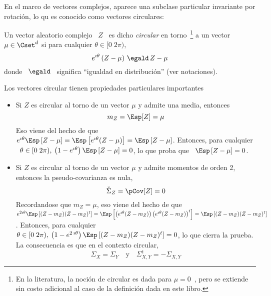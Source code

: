 En el  marco de vectores  complejos, aparece una subclase  particular invariante
por rotaci\'on, lo qu es conocido como vectores circulares:
%
\begin{definicion}\label{Def:MP:VectorAleatorioComplejoCircular}
%
  Un  vector   aleatorio  complejo   \  $Z$  \   es  dicho  {\em   circular}  en
  torno~\footnote{En la literatura, la noci\'on  de circular es dada para $\mu =
    0$~\cite[Def.~24.3.2]{Lap17}, pero  se extiende sin costo  adicional al caso
    de la  definici\'on dada en este libro.}   a un vector $\mu  \in \Cset^d$ si
  para cualquier $\theta \in [0 \; 2 \pi)$,
  \[
  e^{\imath \theta} \left( Z - \mu \right) \, \egald \, Z - \mu
  \]
  donde \ $\egald$ \ significa ``igualdad en distribuci\'on'' (ver notaciones).
\end{definicion}

Los vectores circular tienen propiedades particulares importantes
%
\begin{itemize}
\item  Si $Z$  es circular  al torno  de  un vector  $\mu$ y  admite una  media,
  entonces
  \[
  m_Z = \Esp[Z] = \mu
  \]
  Eso viene  del hecho de  que $e^{\imath \theta}  \Esp\left[ Z - \mu  \right] =
  \Esp\left[  e^{\imath  \theta}  (Z  -  \mu)  \right]  =  \Esp\left[  Z  -  \mu
  \right]$. Entonces,  para cualquier \ $\theta \in  [0 \; 2 \pi),  \: \left(1 -
    e^{\imath \theta} \right) \Esp\left[ Z -  \mu \right] = 0$, lo que proba que
  \ $\Esp\left[ Z - \mu \right] = 0$.
%
\item Si $Z$ es circular al torno  de un vector $\mu$ y admite momentos de orden
  2, entonces la pseudo-covarianza es  nula,
  \[
  \check{\Sigma}_Z = \pCov[Z] = 0
  \]
  Recordandose que $m_Z = \mu$, eso  viene del hecho de que $e^{2 \imath \theta}
  \Esp\left[ (Z - m_Z) (Z - m_Z)^t \right] = \Esp\left[ \left( e^{\imath \theta}
      (Z - m_Z)  \right) \left( e^{\imath \theta} (Z -  m_Z) \right)^t \right] =
  \Esp\left[ (Z - m_Z) (Z - m_Z)^t \right]$.  Entonces, para cualquier \ $\theta
  \in [0 \; 2 \pi), \: \left(1  - e^{2 \, \imath \theta} \right) \Esp\left[ (Z -
    m_Z) (Z - m_Z)^t  \right] = 0$, lo que cierra la  prueba. La consecuencia es
  que en el contexto circular,
  \[
  \Sigma_X = \Sigma_Y \quad \mbox{y} \quad \Sigma_{X,Y}^t = - \Sigma_{X,Y}
  \]
\end{itemize}

